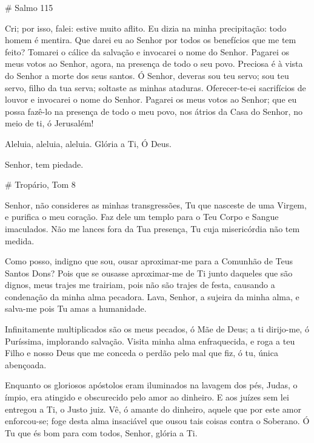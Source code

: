 \documentclass{subfiles}
\begin{document}
# Salmo 115

Cri; por isso, falei: estive muito aflito. Eu dizia na minha precipitação: todo
homem é mentira. Que darei eu ao Senhor por todos os benefícios que me tem
feito? Tomarei o cálice da salvação e invocarei o nome do Senhor. Pagarei os
meus votos ao Senhor, agora, na presença de todo o seu povo. Preciosa é à vista
do Senhor a morte dos seus santos. Ó Senhor, deveras sou teu servo; sou teu
servo, filho da tua serva; soltaste as minhas ataduras. Oferecer-te-ei
sacrifícios de louvor e invocarei o nome do Senhor. Pagarei os meus votos ao
Senhor; que eu possa fazê-lo na presença de todo o meu povo, nos átrios da Casa
do Senhor, no meio de ti, ó Jerusalém!


\Doxology{}

Aleluia, aleluia, aleluia. Glória a Ti, Ó Deus. 

Senhor, tem piedade. 

# Tropário, Tom 8

Senhor, não consideres as minhas transgressões, Tu que nasceste de uma Virgem, e
purifica o meu coração. Faz dele um templo para o Teu Corpo e Sangue imaculados.
Não me lances fora da Tua presença, Tu cuja misericórdia não tem medida.

\doxology{}

Como posso, indigno que sou, ousar aproximar-me para a Comunhão
de Teus Santos Dons? Pois que se ousasse aproximar-me de Ti junto daqueles
que são dignos, meus trajes me trairiam, pois não são trajes de festa, causando
a condenação da minha alma pecadora. Lava, Senhor, a sujeira da minha alma,
e salva-me pois Tu amas a humanidade.

\nowandever{}

Infinitamente multiplicados são os meus pecados, ó Mãe de Deus; a ti dirijo-me,
ó Puríssima, implorando salvação. Visita minha alma enfraquecida, e roga a teu
Filho e nosso Deus que me conceda o perdão pelo mal que fiz, ó tu, única
abençoada.


Enquanto os gloriosos apóstolos eram iluminados na lavagem dos pés,
Judas, o ímpio, era atingido e obscurecido pelo amor ao dinheiro. E aos juízes
sem lei entregou a Ti, o Justo juiz. Vê, ó amante do dinheiro, aquele que por
este amor enforcou-se; foge desta alma insaciável que ousou tais coisas contra
o Soberano. Ó Tu que és bom para com todos, Senhor, glória a Ti.
\end{document}
